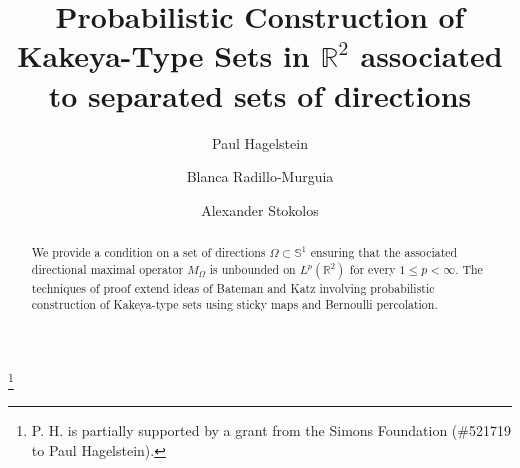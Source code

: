 \documentclass[12pt]{amsart}
\numberwithin{equation}{section}
\theoremstyle{definition}
\theoremstyle{remark}
\begin{document}
\title[Construction of Kakeya-Type Sets]{Probabilistic Construction of Kakeya-Type Sets in $\mathbb{R}^2$ associated to separated sets of directions}

\author[Paul  Hagelstein]{Paul Hagelstein}
\address{P. H.: Department of Mathematics, Baylor University, Waco, Texas 76798}
\thanks{P. H. is partially supported by a grant from the Simons Foundation (\#521719 to Paul Hagelstein).}


\author[Blanca Radillo-Murguia]{Blanca Radillo-Murguia}
\address{B. R.-M.: Department of Mathematics, Baylor University, Waco, Texas 76798}



\author{Alexander Stokolos}
\address{A. S.: Department of Mathematical Sciences, Georgia Southern University, Statesboro, Georgia 30460}



\maketitle





\begin{abstract}   We provide a condition on a set of directions $\Omega \subset \mathbb{S}^1$ ensuring that the associated directional maximal operator $M_\Omega$ is unbounded on $L^p(\mathbb{R}^2)$ for every $1 \leq p < \infty$. The techniques of proof extend ideas of Bateman and Katz involving probabilistic construction of Kakeya-type sets using sticky maps and Bernoulli percolation.   %
\end{abstract}
\mbox{}
\end{document}
